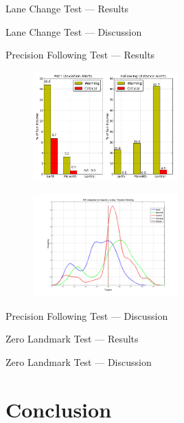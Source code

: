 \documentclass{beamer}
\begin{document}
    \begin{frame}{Lane Change Test --- Results}
    \end{frame}

    \begin{frame}{Lane Change Test --- Discussion}
    \end{frame}

    \begin{frame}{Precision Following Test --- Results}
      \begin{figure}
        \includegraphics[width=0.5\textwidth]{../graphics/precision_following_alert_percents.png}
      \end{figure}
      \begin{figure}
        \includegraphics[width=0.5\textwidth]{../graphics/precision_following_mu_distribution.png}
      \end{figure}
    \end{frame}

    \begin{frame}{Precision Following Test --- Discussion}
    \end{frame}

    \begin{frame}{Zero Landmark Test ---  Results}
    \end{frame}

    \begin{frame}{Zero Landmark Test ---  Discussion}
    \end{frame}


\section{Conclusion}

  \begin{frame}
  \end{frame}
\end{document}
